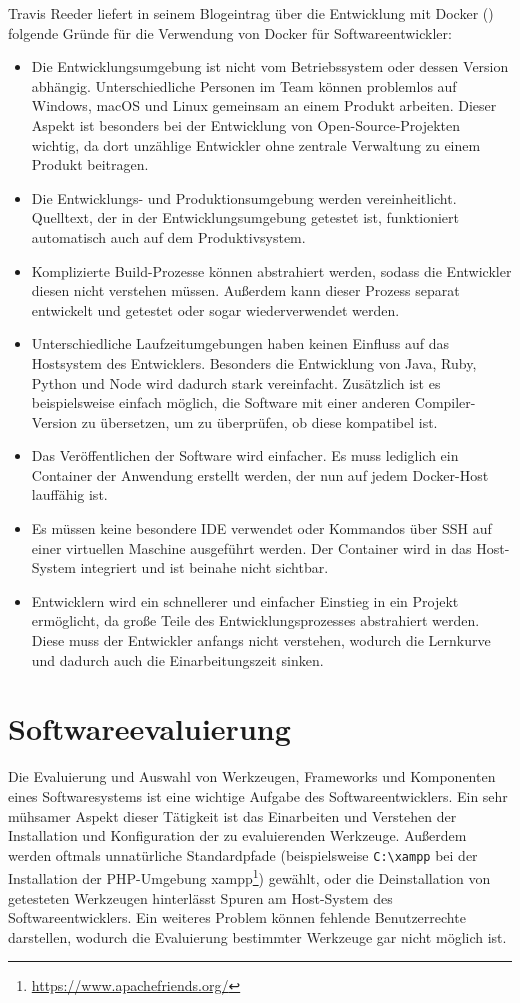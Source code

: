 Travis Reeder liefert in seinem Blogeintrag über die Entwicklung mit Docker (\autocite{why-docker-for-development:online}) folgende Gründe für die Verwendung von Docker für Softwareentwickler:
\begin{itemize}
    \item Die Entwicklungsumgebung ist nicht vom Betriebssystem oder dessen Version abhängig. Unterschiedliche Personen im Team können problemlos auf Windows, macOS und Linux gemeinsam an einem Produkt arbeiten. Dieser Aspekt ist besonders bei der Entwicklung von Open-Source-Projekten wichtig, da dort unzählige Entwickler ohne zentrale Verwaltung zu einem Produkt beitragen.
    \item Die Entwicklungs- und Produktionsumgebung werden vereinheitlicht. Quelltext, der in der Entwicklungsumgebung getestet ist, funktioniert automatisch auch auf dem Produktivsystem.
    \item Komplizierte Build-Prozesse können abstrahiert werden, sodass die Entwickler diesen nicht verstehen müssen. Außerdem kann dieser Prozess separat entwickelt und getestet oder sogar wiederverwendet werden.
    \item Unterschiedliche Laufzeitumgebungen haben keinen Einfluss auf das Hostsystem des Entwicklers. Besonders die Entwicklung von Java, Ruby, Python und Node wird dadurch stark vereinfacht. Zusätzlich ist es beispielsweise einfach möglich, die Software mit einer anderen Compiler-Version zu übersetzen, um zu überprüfen, ob diese kompatibel ist.
    \item Das Veröffentlichen der Software wird einfacher. Es muss lediglich ein Container der Anwendung erstellt werden, der nun auf jedem Docker-Host lauffähig ist.
    \item Es müssen keine besondere IDE verwendet oder Kommandos über SSH auf einer virtuellen Maschine ausgeführt werden. Der Container wird in das Host-System integriert und ist beinahe nicht sichtbar.
    \item Entwicklern wird ein schnellerer und einfacher Einstieg in ein Projekt ermöglicht, da große Teile des Entwicklungsprozesses abstrahiert werden. Diese muss der Entwickler anfangs nicht verstehen, wodurch die Lernkurve und dadurch auch die Einarbeitungszeit sinken.
\end{itemize}


\section{Softwareevaluierung}
\label{sec:softwareevaluierung}
Die Evaluierung und Auswahl von Werkzeugen, Frameworks und Komponenten eines Softwaresystems ist eine wichtige Aufgabe des Softwareentwicklers.
Ein sehr mühsamer Aspekt dieser Tätigkeit ist das Einarbeiten und Verstehen der Installation und Konfiguration der zu evaluierenden Werkzeuge.
Außerdem werden oftmals unnatürliche Standardpfade (beispielsweise \verb$C:\xampp$ bei der Installation der PHP-Umgebung xampp\footnote{\url{https://www.apachefriends.org/}}) gewählt, oder die Deinstallation von getesteten Werkzeugen hinterlässt Spuren am Host-System des Softwareentwicklers.
Ein weiteres Problem können fehlende Benutzerrechte darstellen, wodurch die Evaluierung bestimmter Werkzeuge gar nicht möglich ist.

